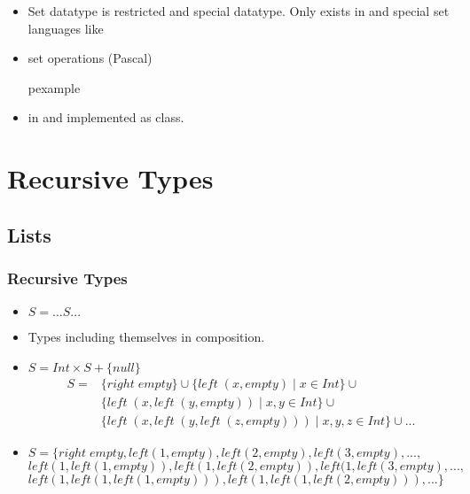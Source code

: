 \begin{frame}
\begin{itemize}
  \item Set datatype is restricted and special datatype. Only exists in  and
  special set languages like 
  \item set operations (Pascal)
\begin{beamercolorbox}{pexample}
\codekumeP
\end{beamercolorbox}

  \item in  and  implemented as class.
\end{itemize}

\end{frame}

\section{Recursive Types}
\subsection{Lists}
\begin{frame}
 \frametitle{Recursive Types}
\begin{itemize}
 \item $S = ... S ...$
 \item Types including themselves in composition.
\end{itemize}
\begin{itemize}
 \item $S = Int \times S + \{null\}$
\[\begin{array}{ll}
S = & \{right\;empty\} \cup \{ left\;(x,empty) \mid x \in Int \} \cup \\
  & \{left\;(x, left\;(y, empty)) \mid x, y \in Int \} \cup \\
  & \{left\;(x, left\;(y, left\;(z,empty))) \mid x,y,z \in Int \} \cup  ...
  \end{array}
\]
\item $S = \{right\;empty, left(1,empty), left(2,empty), left(3,empty), ...,$\\
	$left(1,left(1,empty)), left(1,left(2,empty)), left(1,left(3,empty),...,$\\
	$left(1,left(1,left(1,empty))), left(1,left(1,left(2,empty))), ...\}$
\end{itemize}
\end{frame}

